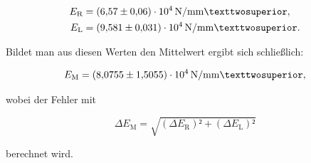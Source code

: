 \begin{align*}
E_\text{R} &= \SI{6.57+-0.06e4}{\newton\per\milli\meter²},\\
E_\text{L} &= \SI{9.581+-0.031e4}{\newton\per\milli\meter²}.
\end{align*}

Bildet man aus diesen Werten den Mittelwert ergibt sich schließlich: 

\begin{equation*}
E_\text{M} = \SI{8.0755+-1.5055e4}{\newton\per\milli\meter²},
\end{equation*}

wobei der Fehler mit 

\begin{equation*}
\Delta E_\text{M} = \sqrt{(\Delta E_\text{R})²+(\Delta E_\text{L})²}
\end{equation*}

berechnet wird.